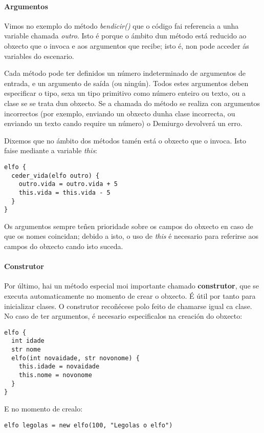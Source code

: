\paragraph{Argumentos}
Vimos no exemplo do método {\it bendicir()} que o código fai referencia a unha
variable chamada {\it outro}. Isto é porque o ámbito dun método está reducido ao
obxecto que o invoca e aos argumentos que recibe; isto é, non pode acceder ás
variables do escenario.
\par
Cada método pode ter definidos un número indeterminado de argumentos de entrada,
e un argumento de saída (ou ningún). Todos estes argumentos deben especificar o
tipo, sexa un tipo primitivo como número enteiro ou texto, ou a clase se se
trata dun obxecto. Se a chamada do método se realiza con argumentos incorrectos
(por exemplo, enviando un obxecto dunha clase incorrecta, ou enviando un texto
cando require un número) o Demiurgo devolverá un erro.
\par
Dixemos que no ámbito dos métodos tamén está o obxecto que o invoca. Isto
faise mediante a variable {\it this}:
\begin{lstlisting}
elfo {
  ceder_vida(elfo outro) {
    outro.vida = outro.vida + 5
    this.vida = this.vida - 5
  }
}
\end{lstlisting}
\par
Os argumentos sempre teñen prioridade sobre os campos do obxecto en caso de que
os nomes coincidan; debido a isto, o uso de {\it this} é necesario para
referirse aos campos do obxecto cando isto suceda.

\paragraph{Construtor}
\label{subsubsec:construtor}
Por último, hai un método especial moi importante chamado \textbf{construtor},
que se executa automaticamente no momento de crear o obxecto. É útil por tanto
para inicializar clases. O construtor recoñécese polo feito de chamarse igual ca
clase. No caso de ter argumentos, é necesario especificalos na creación do obxecto:
\begin{lstlisting}
elfo {
  int idade
  str nome
  elfo(int novaidade, str novonome) {
    this.idade = novaidade
    this.nome = novonome
  }
}
\end{lstlisting}
\par E no momento de crealo:
\begin{lstlisting}
elfo legolas = new elfo(100, "Legolas o elfo")
\end{lstlisting}

